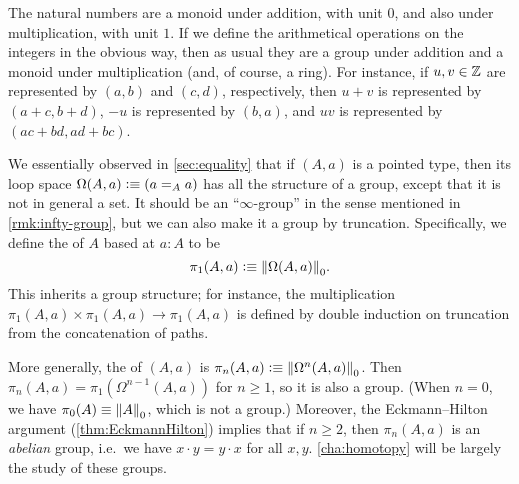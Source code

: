 \begin{eg}
  The natural numbers \N are a monoid under addition, with unit $0$, and also under multiplication, with unit $1$.
  If we define the arithmetical operations on the integers \Z in the obvious way, then as usual they are a group under addition and a monoid under multiplication (and, of course, a ring).
  For instance, if $u, v \in \Z$ are represented by $(a,b)$ and $(c,d)$, respectively, then $u + v$ is represented by $(a + c, b + d)$, $-u$ is represented by $(b, a)$, and $u v$ is represented by $(a c + b d, a d + b c)$.
\end{eg}

\begin{eg}\label{thm:homotopy-groups}
  We essentially observed in \autoref{sec:equality} that if $(A,a)$ is a pointed type, then its loop space $\Omega(A,a)\defeq (\id[A]aa)$ has all the structure of a group, except that it is not in general a set.
  It should be an ``$\infty$-group'' in the sense mentioned in \autoref{rmk:infty-group}, but we can also make it a group by truncation.
  Specifically, we define the 
  of $A$ based at $a:A$ to be
  \[\pi_1(A,a)\defeq \trunc0{\Omega(A,a)}.\]
  This inherits a group structure; for instance, the multiplication $\pi_1(A,a) \times \pi_1(A,a) \to \pi_1(A,a)$ is defined by double induction on truncation from the concatenation of paths.

  More generally, the 
  of $(A,a)$ is $\pi_n(A,a)\defeq \trunc0{\Omega^n(A,a)}$.
  Then $\pi_n(A,a) = \pi_1(\Omega^{n-1}(A,a))$ for $n\ge 1$, so it is also a group.
  (When $n=0$, we have $\pi_0(A) \jdeq \trunc0 A$, which is not a group.)
  Moreover, the Eckmann--Hilton argument  (\autoref{thm:EckmannHilton}) implies that if $n\ge 2$, then $\pi_n(A,a)$ is an \emph{abelian} group, i.e.\ we have $x\cdot y = y\cdot x$ for all $x,y$.
  \autoref{cha:homotopy} will be largely the study of these groups.
\end{eg}

